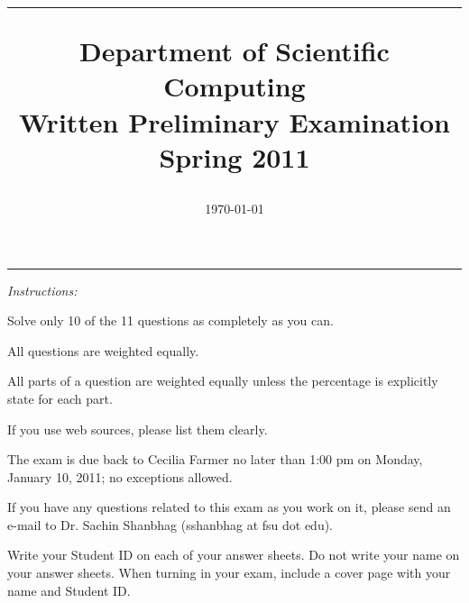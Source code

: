 \documentclass [11point]{article}
\begin{document}
\makeatletter	   %
\renewcommand{\ps@plain}{%
     \renewcommand{\@oddhead}{\textrm{\small {\it DSC Prelim Exam -- Spring 2011}}\hfil\textrm{\thepage}}%
     \renewcommand{\@evenhead}{\@oddhead}%
     \renewcommand{\@oddfoot}{}%
     \renewcommand{\@evenfoot}{\@oddfoot}}
\makeatother     %

\title{
\hrule 
\vspace{0.5cm} 
\large Department of Scientific Computing \\
Written Preliminary Examination \\
Spring 2011 \\
}         %
\author{}        %
\date{\today}          %
\maketitle

\pagestyle{plain}

\hrule 
\bigskip
\textit{Instructions:}

\bigskip

Solve only 10 of the 11 questions as completely as you can.
\vspace{0.25cm}

All questions are weighted equally.
\vspace{0.5cm}

All parts of a question are weighted equally unless the percentage is explicitly state for each part.
\vspace{0.5cm}

If you use web sources, please list them clearly.
\vspace{0.5cm}

The exam is due back to Cecilia Farmer no later than 1:00 pm on Monday,
January 10, 2011; no exceptions allowed.
\vspace{0.5cm}

If you have any questions related to this exam as you work on it, please send an e-mail to Dr. Sachin Shanbhag (sshanbhag at fsu dot edu). 
\vspace{0.5cm}

Write your Student ID on each of your answer sheets. Do not write your name on your answer sheets. When turning in your exam, include a cover page with your name and Student ID.
\vspace{0.5cm}
\end{document}
